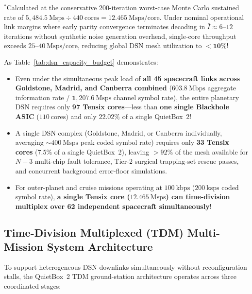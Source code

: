 \documentclass[10pt]{article}
\begin{document}
\begin{table}[!htbp]
{\begin{tabular}{@{}l c r r r r c@{}}
\bottomrule
\end{tabular}%
}
\vspace{2pt}
\footnotesize{\raggedright $^*$Calculated at the conservative 200-iteration worst-case Monte Carlo sustained rate of $5,484.5\ \mathrm{Msps} \div 440\ \mathrm{cores} = \mathbf{12.465\ \mathrm{Msps/core}}$. Under nominal operational link margins where early parity convergence terminates decoding in $\bar{I} \approx 6\text{--}12$ iterations without synthetic noise generation overhead, single-core throughput exceeds $25\text{--}40\ \mathrm{Msps/core}$, reducing global DSN mesh utilization to $\mathbf{<10\%}$!\par}
\end{table}

As Table~\ref{tab:dsn_capacity_budget} demonstrates:
\begin{itemize}[leftmargin=1.8em, itemsep=2pt]
    \item Even under the simultaneous peak load of \textbf{all 45 spacecraft links across Goldstone, Madrid, and Canberra combined} ($\mathbf{603.8\ \mathrm{Mbps}}$ aggregate information rate / $\mathbf{1,207.6\ \mathrm{Msps}}$ channel symbol rate), the entire planetary DSN requires only \textbf{97 Tensix cores}---less than \textbf{one single Blackhole ASIC} ($110\ \mathrm{cores}$) and only $\mathbf{22.02\%}$ of a single QuietBox~2!
    \item A single DSN complex (Goldstone, Madrid, or Canberra individually, averaging $\sim 400\ \mathrm{Msps}$ peak coded symbol rate) requires only \textbf{33 Tensix cores} ($\mathbf{7.5\%}$ of a single QuietBox~2), leaving $>92\%$ of the mesh available for $N+3$ multi-chip fault tolerance, Tier-2 surgical trapping-set rescue passes, and concurrent background error-floor simulations.
    \item For outer-planet and cruise missions operating at $100\ \mathrm{kbps}$ ($200\ \mathrm{ksps}$ coded symbol rate), \textbf{a single Tensix core ($12.465\ \mathrm{Msps}$) can time-division multiplex over 62 independent spacecraft simultaneously}!
\end{itemize}

\subsection{Time-Division Multiplexed (TDM) Multi-Mission System Architecture}

To support heterogeneous DSN downlinks simultaneously without reconfiguration stalls, the QuietBox~2 TDM ground-station architecture operates across three coordinated stages:
\end{document}
